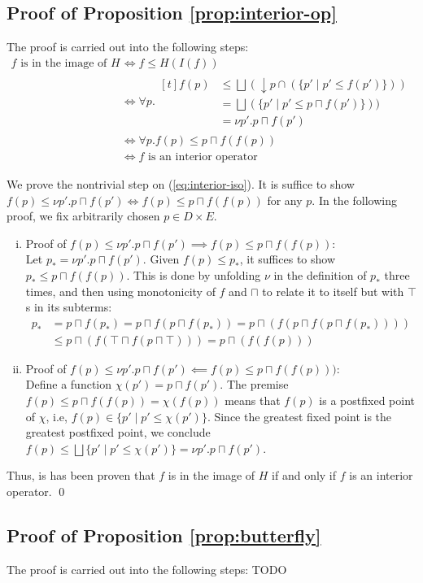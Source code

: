 \documentclass{llncs}
\newcommand{\bigjoin}{\bigsqcup}
\newcommand{\meet}{\sqcap}
\begin{document}
\subsection{Proof of Proposition \ref{prop:interior-op}}
The proof is carried out into the following steps:
\begin{align*}
 f \text{ is in the image of } H &\iff f \leq H(I(f)) \\
  &\iff \forall p. \begin{aligned}[t] f(p)& \leq \bigjoin (\downarrow p \cap (\{p' \mid p' \leq f(p') \})) \\
              &= \bigjoin (\{p' \mid p' \leq  p \meet f(p') \})) \\
              &= \nu p' . p \meet f(p')
            \end{aligned} \\
  &\iff \forall p. f(p) \leq p \meet f(f(p))  \tag{*}\label{eq:interior-iso}\\
  &\iff f \text{ is an interior operator}
\end{align*}

We prove the nontrivial step on (\ref{eq:interior-iso}).
It is suffice to show $f(p) \leq \nu p' . p \meet f(p') \iff f(p) \leq p \meet f(f(p))$ for any $p$.
In the following proof, we fix arbitrarily chosen $p \in D \times E$.
\begin{enumerate}[i.]
\item{Proof of $f(p) \leq \nu p' . p \meet f(p') \implies f(p) \leq p \meet f(f(p))$:}\\
Let $p_{*} = \nu p' . p \meet f(p')$. Given $f (p) \leq p_{*}$, it suffices to show $p_{*} \leq p \meet f(f(p))$. This is done by unfolding $\nu$ in the definition of $p_{*}$ three times, and then using monotonicity of $f$ and $\meet$ to relate it to itself but with $\top$s in its subterms:
\begin{align*}
p_{*} & = p \meet f(p_{*}) = p \meet f(p \meet f(p_{*})) = p \meet (f (p \meet f(p \meet f(p_{*})))) \\
     & \leq p \meet (f (\top \meet f(p \meet \top))) = p \meet (f (f (p)))
\end{align*}
\item{Proof of $f(p) \leq \nu p' . p \meet f(p') \impliedby f(p) \leq p \meet f(f(p)))$:}\\
Define a function $\chi(p') = p \meet f(p')$.
The premise $f(p) \leq p \meet f (f (p)) = \chi (f(p))$ means that $f(p)$ is a postfixed point of $\chi$, i.e, $f(p) \in \{ p' \mid p' \leq \chi(p') \}$. Since the greatest fixed point is the greatest postfixed point, we conclude $f(p) \leq \bigjoin \{ p' \mid p' \leq \chi(p') \} = \nu p' . p \meet f(p') $.
\end{enumerate}
Thus, is has been proven that $f$ is in the image of $H$ if and only if $f$ is an interior operator.
\qed

\subsection{Proof of Proposition \ref{prop:butterfly}}
The proof is carried out into the following steps: TODO
\end{document}
